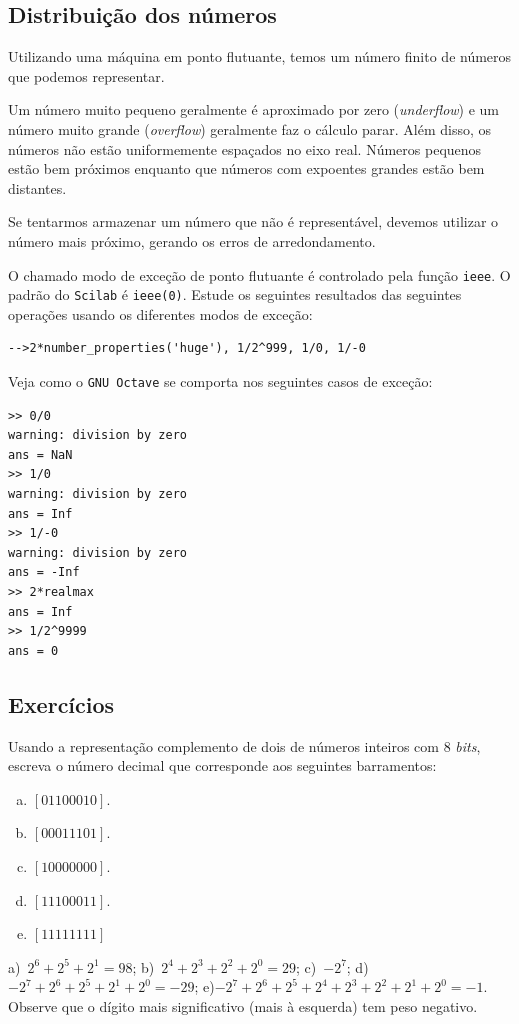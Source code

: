 \subsection{Distribuição dos números}
Utilizando uma máquina em ponto flutuante, temos um número finito de números que podemos representar.

Um número muito pequeno geralmente é aproximado por zero (\emph{underflow}) e um número muito grande (\emph{overflow}) geralmente faz o cálculo parar. Além disso, os números não estão uniformemente espaçados no eixo real. Números pequenos estão bem próximos enquanto que números com expoentes grandes estão bem distantes.

Se tentarmos armazenar um número que não é representável, devemos utilizar o número mais próximo, gerando os erros de arredondamento.

\ifisscilab
\begin{obs}
  O chamado modo de exceção de ponto flutuante é controlado pela função \verb+ieee+. O padrão do \verb+Scilab+ é \verb+ieee(0)+. Estude os seguintes resultados das seguintes operações usando os diferentes modos de exceção:
\begin{verbatim}
-->2*number_properties('huge'), 1/2^999, 1/0, 1/-0
\end{verbatim}
\end{obs}
\fi
\ifisoctave
\begin{obs}
  Veja como o \verb+GNU Octave+ se comporta nos seguintes casos de exceção:
\begin{verbatim}
>> 0/0
warning: division by zero
ans = NaN
>> 1/0
warning: division by zero
ans = Inf
>> 1/-0
warning: division by zero
ans = -Inf
>> 2*realmax
ans = Inf
>> 1/2^9999
ans = 0
\end{verbatim}
\end{obs}
\fi

\subsection*{Exercícios}

\begin{exer}
  Usando a representação complemento de dois de números inteiros com $8$ \emph{bits}, escreva o número decimal que corresponde aos seguintes barramentos:
  \begin{enumerate}[a)]
  \item $[01100010]$.
  \item $[00011101]$.
  \item $[10000000]$.
  \item $[11100011]$.
  \item $[11111111]$
   \end{enumerate}
\end{exer}
\begin{resp}
  a)~$2^6+2^5+2^1=98$; b)~$2^4+2^3+2^2+2^0=29$; c)~$-2^7$; d)~$-2^7+2^6+2^5+2^1+2^0=-29$; e)$-2^7+2^6+2^5+2^4+2^3+2^2+2^1+2^0=-1$.
  Observe que o dígito mais significativo (mais à esquerda) tem peso negativo.
\end{resp}

